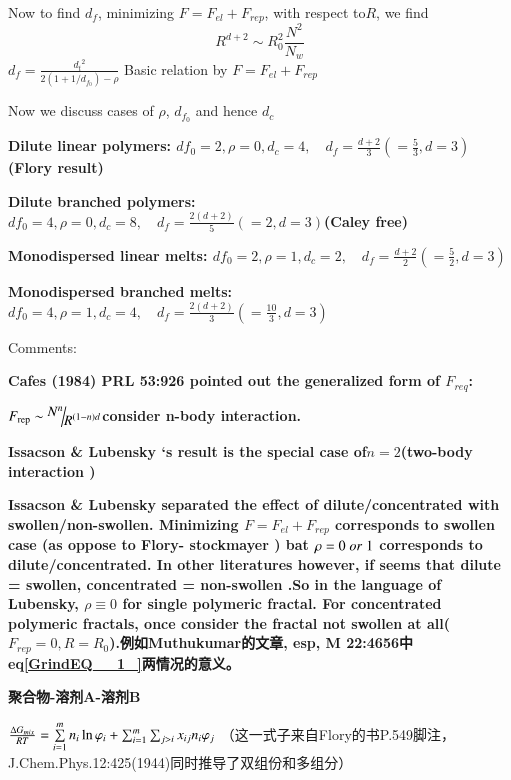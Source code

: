 \documentclass{article} %
\begin{document}
\noindent 

\noindent Now to find $d_{f} $, minimizing $F=F_{el} +F_{rep} $, with respect to$R$, we find
\[R^{d+2} \sim R_{0}^{2} \frac{N^{2} }{N_{w} } \] 
$\boxed{d_{f} =\frac{d_{t} {}^{2} }{2(1+1/d_{f_{0} } )-\rho } } $ Basic relation by $F=F_{el} +F_{rep} $

\noindent Now we discuss cases of $\rho $, $d_{f_{0} } $ and hence $d_{c} $ 


{\bf  Dilute linear polymers: $df_{0} =2,\rho =0,d_{c} =4,\quad d_{f} =\frac{d+2}{3} (\boxed{=\frac{5}{3} ,d=3} )$ (Flory result)}


{\bf  Dilute branched polymers: $\boxed{df_{0} =4} ,\rho =0,d_{c} =8,\quad d_{f} =\frac{2\left(d+2\right)}{5} (=2,d=3)$(Caley free)}


{\bf  Monodispersed linear melts: $df_{0} =2,\rho =1,d_{c} =2,\quad d_{f} =\frac{d+2}{2} (=\frac{5}{2} ,d=3)$}


{\bf  Monodispersed branched melts: $df_{0} =4,\rho =1,d_{c} =4,\quad d_{f} =\frac{2\left(d+2\right)}{3} (=\frac{10}{3} ,d=3)$}

\noindent Comments:


{\bf  Cafes (1984) PRL 53:926 pointed out the generalized form of $F_{req} $:}

\noindent 
{\bf $F_{{\rm rep}} \sim {\raise0.7ex\hbox{$ N^{n}  $}\!\mathord{\left/ {\vphantom {N^{n}  R^{(1-n)d} }} \right. \kern-\nulldelimiterspace}\!\lower0.7ex\hbox{$ R^{(1-n)d}  $}} $consider n-body interaction.}

\noindent 
{\bf Issacson \& Lubensky `s result is the special case of$n=2$(two-body interaction )}


{\bf  Issacson \& Lubensky separated the effect of dilute/concentrated with swollen/non-swollen. Minimizing $F=F_{el} +F_{rep} $ corresponds to swollen case (as oppose to Flory- stockmayer ) bat $\rho =0{\rm \; }or{\rm \; }1$ corresponds to dilute/concentrated. In other literatures however, if seems that dilute = swollen, concentrated = non-swollen .So in the language of Lubensky, $\rho \equiv 0$ for single polymeric fractal. For concentrated polymeric fractals, once consider the fractal not swollen at all($F_{rep} =0,R=R_{0} $).例如Muthukumar的文章, esp, M 22:4656中eq\eqref{GrindEQ__1_}两情况的意义。}

\noindent \eject 

\noindent \textbf{聚合物-溶剂A-溶剂B}

\noindent $\frac{{\rm \Delta }G_{mix} }{RT} =\mathop{\sum }\limits_{i=1}^{m} n_{i} \ln \varphi _{i} +\sum _{i=1}^{m}\sum _{j>i}x_{ij} n_{i} \varphi _{j}   $ （这一式子来自Flory的书P.549脚注，J.Chem.Phys.12:425(1944)同时推导了双组份和多组分）
\end{document}
